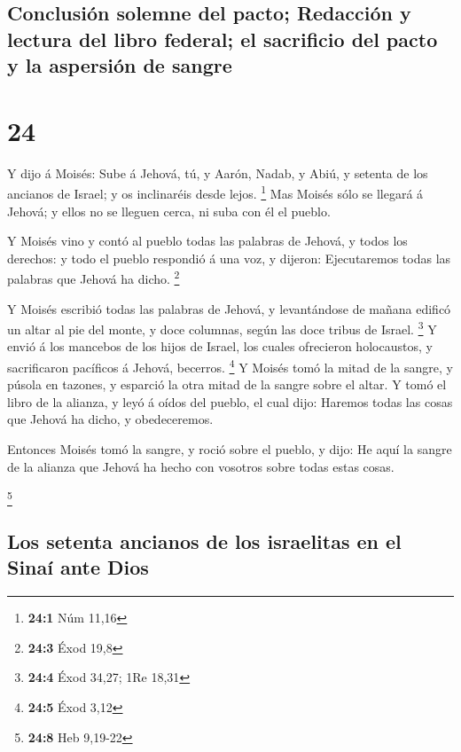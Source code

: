 \hypertarget{conclusiuxf3n-solemne-del-pacto-redacciuxf3n-y-lectura-del-libro-federal-el-sacrificio-del-pacto-y-la-aspersiuxf3n-de-sangre}{%
\subsection{Conclusión solemne del pacto; Redacción y lectura del libro
federal; el sacrificio del pacto y la aspersión de
sangre}\label{conclusiuxf3n-solemne-del-pacto-redacciuxf3n-y-lectura-del-libro-federal-el-sacrificio-del-pacto-y-la-aspersiuxf3n-de-sangre}}

\hypertarget{section-23}{%
\section{24}\label{section-23}}

 Y dijo á Moisés: Sube á Jehová, tú, y Aarón, Nadab, y Abiú,
y setenta de los ancianos de Israel; y os inclinaréis desde lejos.
\footnote{\textbf{24:1} Núm 11,16}  Mas Moisés sólo se
llegará á Jehová; y ellos no se lleguen cerca, ni suba con él el pueblo.

 Y Moisés vino y contó al pueblo todas las palabras de
Jehová, y todos los derechos: y todo el pueblo respondió á una voz, y
dijeron: Ejecutaremos todas las palabras que Jehová ha dicho.
\footnote{\textbf{24:3} Éxod 19,8}

 Y Moisés escribió todas las palabras de Jehová, y
levantándose de mañana edificó un altar al pie del monte, y doce
columnas, según las doce tribus de Israel. \footnote{\textbf{24:4} Éxod
  34,27; 1Re 18,31}  Y envió á los mancebos de los hijos de
Israel, los cuales ofrecieron holocaustos, y sacrificaron pacíficos á
Jehová, becerros. \footnote{\textbf{24:5} Éxod 3,12}  Y
Moisés tomó la mitad de la sangre, y púsola en tazones, y esparció la
otra mitad de la sangre sobre el altar.  Y tomó el libro de
la alianza, y leyó á oídos del pueblo, el cual dijo: Haremos todas las
cosas que Jehová ha dicho, y obedeceremos.

 Entonces Moisés tomó la sangre, y roció sobre el pueblo, y
dijo: He aquí la sangre de la alianza que Jehová ha hecho con vosotros
sobre todas estas cosas.

\footnote{\textbf{24:8} Heb 9,19-22}

\hypertarget{los-setenta-ancianos-de-los-israelitas-en-el-sinauxed-ante-dios}{%
\subsection{Los setenta ancianos de los israelitas en el Sinaí ante
Dios}\label{los-setenta-ancianos-de-los-israelitas-en-el-sinauxed-ante-dios}}

